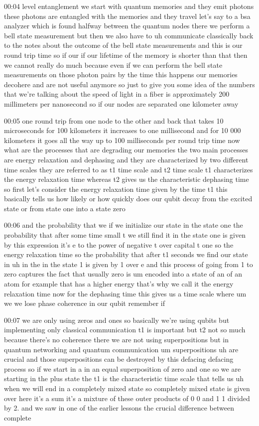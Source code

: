 00:04
level entanglement we start with quantum memories and they
emit photons these photons are entangled with the memories and they travel
let's say to a bsa analyzer which is found halfway between
the quantum nodes there we perform a bell state measurement
but then we also have to uh communicate classically
back to the notes about the outcome of the bell state measurements
and this is our round trip time so if our if our lifetime
of the memory is shorter than that then we cannot really do much because even if
we can perform the bell state measurements on those
photon pairs by the time this happens our memories
decohere and are not useful anymore so just to give you some idea of the
numbers that we're talking about the speed of light
in a fiber is approximately 200 millimeters per nanosecond
so if our nodes are separated one kilometer away

00:05
one round trip from one node to the other and back that takes
10 microseconds for 100 kilometers it increases to
one millisecond and for 10 000 kilometers it goes all the way up to
100 milliseconds per round trip time now what are the processes that are
degrading our memories the two main processes are energy relaxation
and dephasing and they are characterized by two different
time scales they are referred to as t1 time scale and t2 time scale
t1 characterizes the energy relaxation time
whereas t2 gives us the characteristic dephasing time
so first let's consider the energy relaxation time given by the time t1
this basically tells us how likely or how quickly does
our qubit decay from the excited state or from state one into a state zero

00:06
and the probability that we if we initialize our state in the state one
the probability that after some time small t we still find it
in the state one is given by this expression it's e to the power of negative t
over capital t one so the energy relaxation time
so the probability that after t1 seconds we find our state in uh
in the in the state 1 is given by 1 over e and
this process of going from 1 to zero captures the
fact that usually zero is um encoded into a
state of an of an atom for example that has a higher energy that's why we call
it the energy relaxation time now for the dephasing time this gives us
a time scale where um we we lose phase coherence in our qubit remember if

00:07
we are only using zeros and ones so basically we're using qubits
but implementing only classical communication t1 is important but t2 not so much
because there's no coherence there we are not using superpositions
but in quantum networking and quantum communication um superpositions uh are
crucial and those superpositions can be destroyed by this defacing
defacing process so if we start in a in an equal superposition of zero and
one so we are starting in the plus state the t1 is the characteristic time scale
that tells us uh when we will end in a completely
mixed state so completely mixed state is given over here it's a sum it's a
mixture of these outer products of 0 0 and 1 1 divided by 2.
and we saw in one of the earlier lessons the crucial difference between complete


